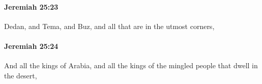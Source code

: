 		\paragraph{Jeremiah 25:23} %
			\label{JEREMIAH-25-23}

			Dedan, and Tema, and Buz, and all that are in the utmost corners,


		\paragraph{Jeremiah 25:24} %
			\label{JEREMIAH-25-24}

			And all the kings of Arabia, and all the kings of the mingled people that dwell in the desert,


